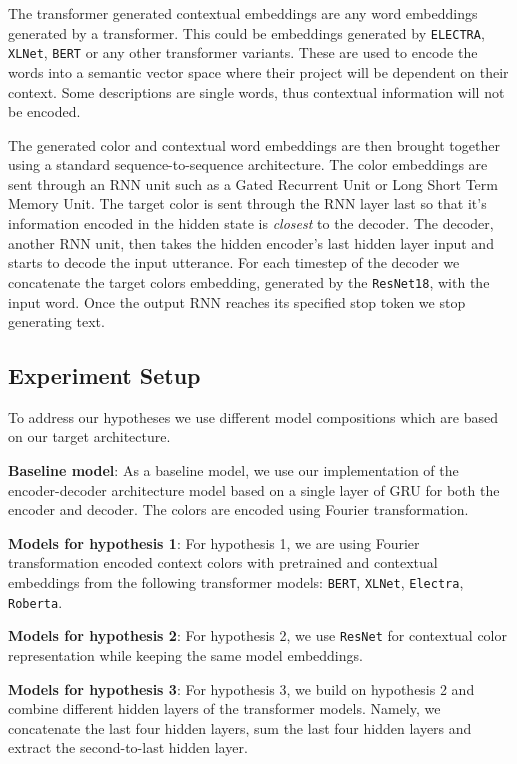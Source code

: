\par
The transformer generated contextual embeddings are any word embeddings generated by a transformer. This could be embeddings generated by \texttt{ELECTRA}, \texttt{XLNet}, \texttt{BERT} or any other transformer variants. These are used to encode the words into a semantic vector space where their project will be dependent on their context. Some descriptions are single words, thus contextual information will not be encoded.

\par
The generated color and contextual word embeddings are then brought together using a standard sequence-to-sequence architecture. The color embeddings are sent through an RNN unit such as a Gated Recurrent Unit or Long Short Term Memory Unit. The target color is sent through the RNN layer last so that it’s information encoded in the hidden state is \emph{closest} to the decoder. The decoder, another RNN unit,  then takes the hidden encoder's last hidden layer input and starts to decode the input utterance. For each timestep of the decoder we concatenate the target colors embedding, generated by the \texttt{ResNet18}, with the input word. Once the output RNN reaches its specified stop token we stop generating text.

\subsection{Experiment Setup}
To address our hypotheses we use different model compositions which are based on our target architecture.

\textbf{Baseline model}:
As a baseline model, we use our implementation of the encoder-decoder architecture model based on a single layer of GRU for both the encoder and decoder. The colors are encoded using Fourier transformation.

\textbf{Models for hypothesis 1}:
For hypothesis 1, we are using Fourier transformation encoded context colors with pretrained and contextual embeddings from the following transformer models: \texttt{BERT}, \texttt{XLNet}, \texttt{Electra}, \texttt{Roberta}.

\textbf{Models for hypothesis 2}:
For hypothesis 2, we use \texttt{ResNet} for contextual color representation while keeping the same model embeddings.

\textbf{Models for hypothesis 3}:
For hypothesis 3, we build on hypothesis 2 and combine different hidden layers of the transformer models. Namely, we concatenate the last four hidden layers, sum the last four hidden layers and extract the second-to-last hidden layer.